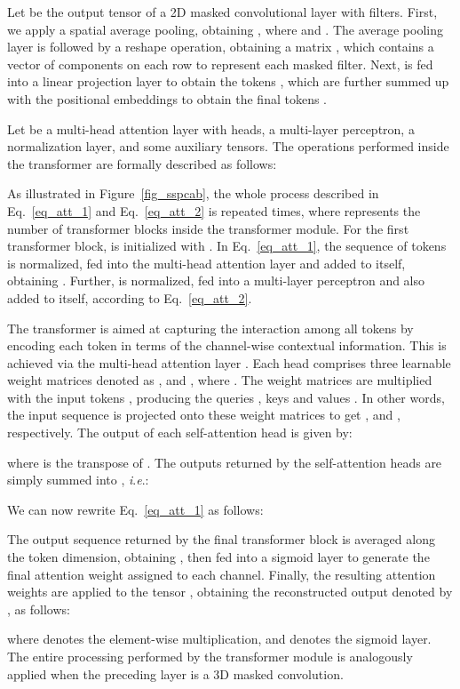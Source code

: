 \documentclass[10pt,journal,compsoc]{IEEEtran}
\newcommand{\ie}{\textit{i}.\textit{e}.}
\begin{document}
Let  be the output tensor of a 2D masked convolutional layer with  filters. First, we apply a spatial average pooling, obtaining , where  and . The average pooling layer is followed by a reshape operation, obtaining a matrix , which contains a vector of  components on each row to represent each masked filter. Next,  is fed into a linear projection layer to obtain the tokens , which are further summed up with the positional embeddings to obtain the final tokens . 

Let  be a multi-head attention layer with  heads,  a multi-layer perceptron,  a normalization layer, and  some auxiliary tensors. The operations performed inside the transformer are formally described as follows:


As illustrated in Figure~\ref{fig_sspcab}, the whole process described in Eq.~\eqref{eq_att_1} and Eq.~\eqref{eq_att_2} is repeated  times, where  represents the number of transformer blocks inside the transformer module. For the first transformer block,  is initialized with . In Eq.~\eqref{eq_att_1}, the sequence of  tokens  is normalized, fed into the multi-head attention layer and added to itself, obtaining . Further,  is normalized, fed into a multi-layer perceptron and also added to itself, according to Eq.~\eqref{eq_att_2}. 

The transformer is aimed at capturing the interaction among all  tokens by encoding each token in terms of the channel-wise contextual information. This is achieved via the multi-head attention layer . Each head  comprises three learnable weight matrices denoted as ,  and , where . The weight matrices are multiplied with the input tokens , producing the queries , keys  and values . In other words, the input sequence  is projected onto these weight matrices to get ,  and , respectively. The output  of each self-attention head is given by:

where  is the transpose of . The outputs returned by the self-attention heads are simply summed into , \ie:

We can now rewrite Eq.~\eqref{eq_att_1} as follows:

The output sequence  returned by the final transformer block is averaged along the token dimension, obtaining , then fed into a sigmoid layer to generate the final attention weight assigned to each channel. Finally, the resulting attention weights are applied to the tensor , obtaining the reconstructed output denoted by , as follows:

where  denotes the element-wise multiplication, and  denotes the sigmoid layer. The entire processing performed by the transformer module is analogously applied when the preceding layer is a 3D masked convolution.
\end{document}
